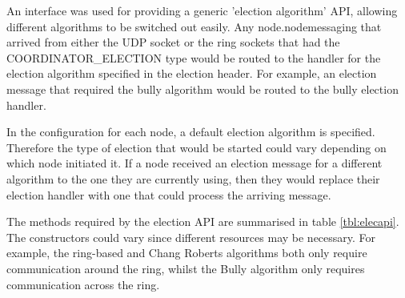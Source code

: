 \documentclass[12pt]{article}
\begin{document}
An interface was used for providing a generic 'election algorithm' API, allowing different algorithms to be switched out easily. Any node.nodemessaging that arrived from either the UDP socket or the ring sockets that had the COORDINATOR\_ELECTION type would be routed to the handler for the election algorithm specified in the election header. For example, an election message that required the bully algorithm would be routed to the bully election handler.

In the configuration for each node, a default election algorithm is specified. Therefore the type of election that would be started could vary depending on which node initiated it. If a node received an election message for a different algorithm to the one they are currently using, then they would replace their election handler with one that could process the arriving message. 

The methods required by the election API are summarised in table \ref{tbl:elecapi}. The constructors could vary since different resources may be necessary. For example, the ring-based and Chang Roberts algorithms both only require communication around the ring, whilst the Bully algorithm only requires communication across the ring.

\begin{table}[!ht]
\centering
{}
\caption{Methods of the election handler interface.}
\label{tbl:elecapi}
\end{table}
\end{document}
